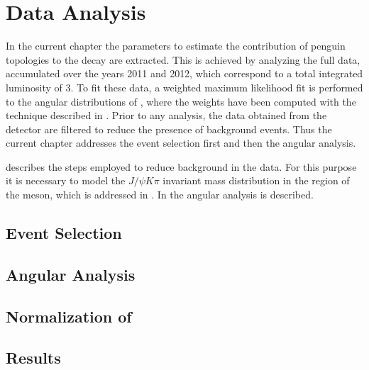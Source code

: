 \chapter{Data Analysis}
\label{Data_Analysis}

In the current chapter the parameters to estimate the contribution of penguin topologies to the \BsJpsiPhi
decay are extracted. This is achieved by analyzing the full \runone \lhcb data, accumulated over the years 2011 and 2012,
which correspond to a total integrated luminosity of 3\invfb. To fit these data, a weighted maximum likelihood fit
is performed to the angular distributions of \BsJpsiKst, where the weights have been computed with the \sPlot
technique \cite{splot} described in .
Prior to any analysis, the data obtained from the detector are filtered to reduce the presence of
background events. Thus the current chapter addresses the event selection first and then the angular analysis.

 describes the steps employed to reduce background in the data. For this purpose
it is necessary to model the $J/\psi K\pi$ invariant mass distribution in the region of the \Bs meson, which
is addressed in . In  the angular analysis is described.\\

\section{Event Selection}
\label{Event_Selection}


\section{Angular Analysis}
\label{Angular_Analysis}


\section{Normalization of \BsJpsiKpi}
\label{Normalization}


\section{Results}
\label{Results}

